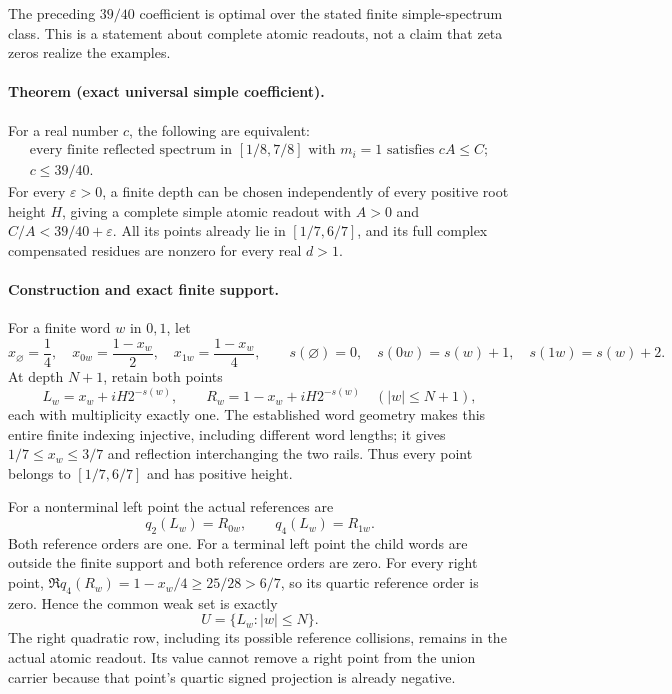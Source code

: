 The preceding \(39/40\) coefficient is optimal over the stated finite
simple-spectrum class. This is a statement about complete atomic readouts,
not a claim that zeta zeros realize the examples.

\paragraph{Theorem (exact universal simple coefficient).}
For a real number \(c\), the following are equivalent:
\[
 \begin{gathered}
 \text{every finite reflected spectrum in }[1/8,7/8]
 \text{ with }m_i=1\text{ satisfies }cA\le C;\\
 c\le39/40.
 \end{gathered}
\]
For every \(\varepsilon>0\), a finite depth can be chosen independently
of every positive root height \(H\), giving a complete simple atomic
readout with \(A>0\) and \(C/A<39/40+\varepsilon\).
All its points already lie in \([1/7,6/7]\), and its full complex
compensated residues are nonzero for every real \(d>1\).

\paragraph{Construction and exact finite support.}
For a finite word \(w\) in \(0,1\), let
\[
 x_{\varnothing}=\frac14,\quad
 x_{0w}=\frac{1-x_w}{2},\quad
 x_{1w}=\frac{1-x_w}{4},\qquad
 s(\varnothing)=0,\quad s(0w)=s(w)+1,\quad s(1w)=s(w)+2.
\]
At depth \(N+1\), retain both points
\[
 L_w=x_w+iH2^{-s(w)},\qquad
 R_w=1-x_w+iH2^{-s(w)}
       \quad (|w|\le N+1),
\]
each with multiplicity exactly one. The established word geometry makes
this entire finite indexing injective, including different word lengths;
it gives \(1/7\le x_w\le3/7\) and reflection interchanging the two rails.
Thus every point belongs to \([1/7,6/7]\) and has positive height.

For a nonterminal left point the actual references are
\[
 q_2(L_w)=R_{0w},\qquad q_4(L_w)=R_{1w}.
\]
Both reference orders are one. For a terminal left point the child words
are outside the finite support and both reference orders are zero.
For every right point,
\(\Re q_4(R_w)=1-x_w/4\ge25/28>6/7\), so its quartic reference order
is zero. Hence the common weak set is exactly
\[
 U=\{L_w:|w|\le N\}.
\]
The right quadratic row, including its possible reference collisions,
remains in the actual atomic readout. Its value cannot remove a right
point from the union carrier because that point's quartic signed
projection is already negative.

